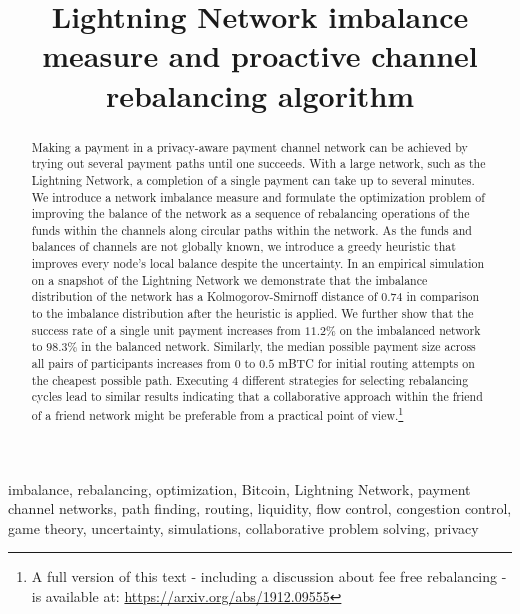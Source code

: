 \documentclass[conference]{IEEEtran}
\title{Lightning Network imbalance measure and proactive channel rebalancing algorithm}
\begin{document}
 

\author{
\and
{}
}

\maketitle
\begin{abstract}
Making a payment in a privacy-aware payment channel network can be achieved by trying out several payment paths until one succeeds.
With a large network, such as the Lightning Network, a completion of a single payment can take up to several minutes.
We introduce a network imbalance measure and formulate the optimization problem of improving the balance of the network as a sequence of rebalancing operations of the funds within the channels along circular paths within the network.
As the funds and balances of channels are not globally known, we introduce a greedy heuristic
that improves every node's local balance despite the uncertainty.
In an empirical simulation on a snapshot of the Lightning Network we demonstrate that the imbalance distribution of the network has a Kolmogorov-Smirnoff distance of $0.74$ in comparison to the imbalance distribution after the heuristic is applied.
We further show that the success rate of a single unit payment increases from $11.2\%$ on the imbalanced network to $98.3\%$ in the balanced network.
Similarly, the median possible payment size across all pairs of participants increases from $0$ to $0.5$ mBTC for initial routing attempts on the cheapest possible path.
Executing $4$ different strategies for selecting rebalancing cycles lead to similar results 
indicating that a collaborative approach within the friend of a friend network might be preferable from a practical point of view.\footnote{A full version of this text - including a discussion about fee free rebalancing - is available at: \url{https://arxiv.org/abs/1912.09555}}

\end{abstract}
\begin{IEEEkeywords}
imbalance, rebalancing, optimization, Bitcoin, Lightning Network, payment channel networks, path finding, routing, liquidity, flow control, congestion control, game theory, uncertainty, simulations, collaborative problem solving, privacy 
\end{IEEEkeywords}
\end{document}
